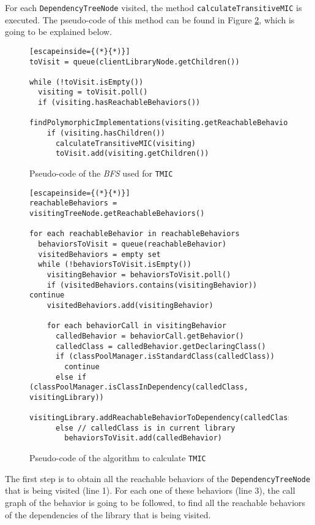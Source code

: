 For each \texttt{DependencyTreeNode} visited, the method \texttt{calculateTransitiveMIC} is executed. The pseudo-code of this method can be found in Figure \ref{fig:calculate-tmic}, which is going to be explained below.

\begin{figure}[ht!]
\begin{lstlisting}[escapeinside={(*}{*)}]
toVisit = queue(clientLibraryNode.getChildren())

while (!toVisit.isEmpty())
  visiting = toVisit.poll()
  if (visiting.hasReachableBehaviors())
    findPolymorphicImplementations(visiting.getReachableBehaviors())
    if (visiting.hasChildren())
      calculateTransitiveMIC(visiting)
      toVisit.add(visiting.getChildren())
\end{lstlisting}
\caption{Pseudo-code of the \textit{BFS} used for \texttt{TMIC}}
\label{fig:tree-traversing-tmic}
\end{figure}

\begin{figure}[ht!]
\begin{lstlisting}[escapeinside={(*}{*)}]
reachableBehaviors = visitingTreeNode.getReachableBehaviors()

for each reachableBehavior in reachableBehaviors
  behaviorsToVisit = queue(reachableBehavior)
  visitedBehaviors = empty set
  while (!behaviorsToVisit.isEmpty())
    visitingBehavior = behaviorsToVisit.poll()
    if (visitedBehaviors.contains(visitingBehavior)) continue
    visitedBehaviors.add(visitingBehavior)

    for each behaviorCall in visitingBehavior
      calledBehavior = behaviorCall.getBehavior()
      calledClass = calledBehavior.getDeclaringClass()
      if (classPoolManager.isStandardClass(calledClass))
        continue
      else if (classPoolManager.isClassInDependency(calledClass, visitingLibrary))
        visitingLibrary.addReachableBehaviorToDependency(calledClass)
      else // calledClass is in current library
        behaviorsToVisit.add(calledBehavior)
\end{lstlisting}
\caption{Pseudo-code of the algorithm to calculate \texttt{TMIC}}
\label{fig:calculate-tmic}
\end{figure}

The first step is to obtain all the reachable behaviors of the \texttt{DependencyTreeNode} that is being visited (line 1). For each one of these behaviors (line 3), the call graph of the behavior is going to be followed, to find all the reachable behaviors of the dependencies of the library that is being visited.

